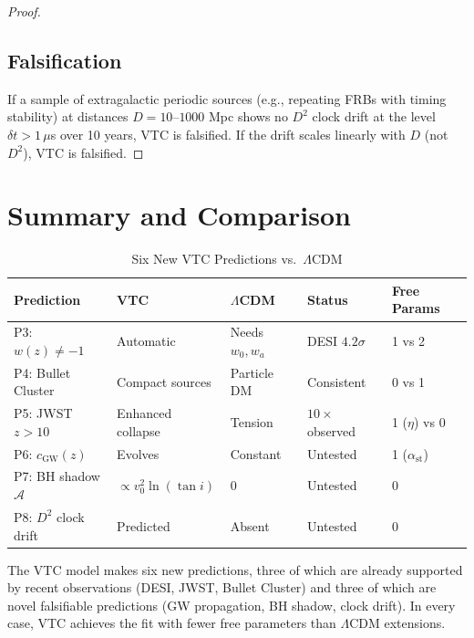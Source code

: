 \documentclass[11pt,a4paper]{article}
\theoremstyle{definition}
\begin{document}
\begin{proof}
\subsection{Falsification}

If a sample of extragalactic periodic sources (e.g., repeating FRBs with timing stability) at distances $D = 10$--$1000$ Mpc shows no $D^2$ clock drift at the level $\delta t > 1\,\mu$s over 10 years, VTC is falsified. If the drift scales linearly with $D$ (not $D^2$), VTC is falsified.

\end{proof}

\section{Summary and Comparison}

\begin{table}[ht]
\centering
\caption{Six New VTC Predictions vs.\ $\Lambda$CDM}
\label{tab:predictions}
\begin{tabular}{lllll}
\toprule
\textbf{Prediction} & \textbf{VTC} & \textbf{$\Lambda$CDM} & \textbf{Status} & \textbf{Free Params} \\
\midrule
P3: $w(z) \neq -1$ & Automatic & Needs $w_0, w_a$ & DESI $4.2\sigma$ & 1 vs 2 \\
P4: Bullet Cluster & Compact sources & Particle DM & Consistent & 0 vs 1 \\
P5: JWST $z>10$ & Enhanced collapse & Tension & $10\times$ observed & 1 ($\eta$) vs 0 \\
P6: $c_\mathrm{GW}(z)$ & Evolves & Constant & Untested & 1 ($\alpha_\mathrm{st}$) \\
P7: BH shadow $\mathcal{A}$ & $\propto v_0^2\ln(\tan i)$ & 0 & Untested & 0 \\
P8: $D^2$ clock drift & Predicted & Absent & Untested & 0 \\
\bottomrule
\end{tabular}
\end{table}

The VTC model makes six new predictions, three of which are already supported by recent observations (DESI, JWST, Bullet Cluster) and three of which are novel falsifiable predictions (GW propagation, BH shadow, clock drift). In every case, VTC achieves the fit with fewer free parameters than $\Lambda$CDM extensions.
\end{document}
